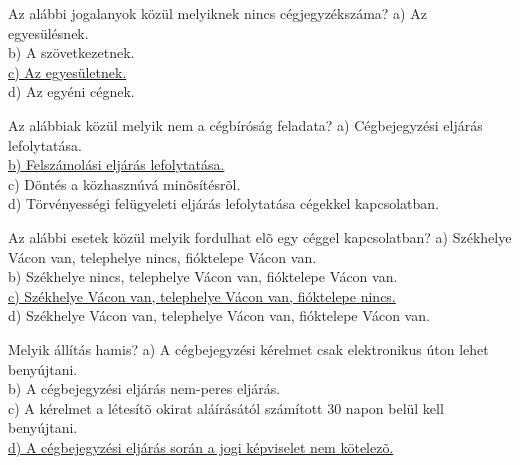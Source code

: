 \begin{frame}

\begin{tcolorbox}[title={94. Kérdés}]
Az alábbi jogalanyok közül melyiknek nincs cégjegyzékszáma?
\tcblower
a) Az egyesülésnek.\\
b) A szövetkezetnek.\\
\uline {c) Az egyesületnek.}\\
d) Az egyéni cégnek.
\end{tcolorbox}

\begin{tcolorbox}[title={95. Kérdés}]
Az alábbiak közül melyik nem a cégbíróság feladata?
\tcblower
a) Cégbejegyzési eljárás lefolytatása.\\
\uline {b) Felszámolási eljárás lefolytatása.}\\
c) Döntés a közhasznúvá minõsítésrõl.\\
d) Törvényességi felügyeleti eljárás lefolytatása cégekkel kapcsolatban.
\end{tcolorbox}

\begin{tcolorbox}[title={96. Kérdés}]
Az alábbi esetek közül melyik fordulhat elõ egy céggel kapcsolatban?
\tcblower
a) Székhelye Vácon van, telephelye nincs, fióktelepe Vácon van.\\
b) Székhelye nincs, telephelye Vácon van, fióktelepe Vácon van.\\
\uline {c) Székhelye Vácon van, telephelye Vácon van, fióktelepe nincs.}\\
d) Székhelye Vácon van, telephelye Vácon van, fióktelepe Vácon van.
\end{tcolorbox}

\begin{tcolorbox}[title={97. Kérdés}]
Melyik állítás hamis?
\tcblower
a) A cégbejegyzési kérelmet csak elektronikus úton lehet benyújtani.\\
b) A cégbejegyzési eljárás nem-peres eljárás. \\
c) A kérelmet a létesítõ okirat aláírásától számított 30 napon belül kell benyújtani.\\
\uline {d) A cégbejegyzési eljárás során a jogi képviselet nem kötelezõ.}
\end{tcolorbox}

\end{frame}


